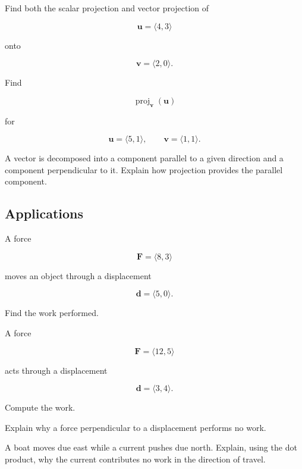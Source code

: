 \begin{exercise}
Find both the scalar projection and vector projection of

\[
\mathbf{u}
=
\langle 4,3\rangle
\]

onto

\[
\mathbf{v}
=
\langle 2,0\rangle.
\]
\end{exercise}

\begin{exercise}
Find

\[
\operatorname{proj}_{\mathbf{v}}(\mathbf{u})
\]

for

\[
\mathbf{u}
=
\langle 5,1\rangle,
\qquad
\mathbf{v}
=
\langle 1,1\rangle.
\]
\end{exercise}

\begin{exercise}
A vector is decomposed into a component parallel to a given direction and
a component perpendicular to it. Explain how projection provides the
parallel component.
\end{exercise}

\subsection*{Applications}

\begin{exercise}
A force

\[
\mathbf{F}
=
\langle 8,3\rangle
\]

moves an object through a displacement

\[
\mathbf{d}
=
\langle 5,0\rangle.
\]

Find the work performed.
\end{exercise}

\begin{exercise}
A force

\[
\mathbf{F}
=
\langle 12,5\rangle
\]

acts through a displacement

\[
\mathbf{d}
=
\langle 3,4\rangle.
\]

Compute the work.
\end{exercise}

\begin{exercise}
Explain why a force perpendicular to a displacement performs no work.
\end{exercise}

\begin{exercise}
A boat moves due east while a current pushes due north. Explain, using
the dot product, why the current contributes no work in the direction of
travel.
\end{exercise}

